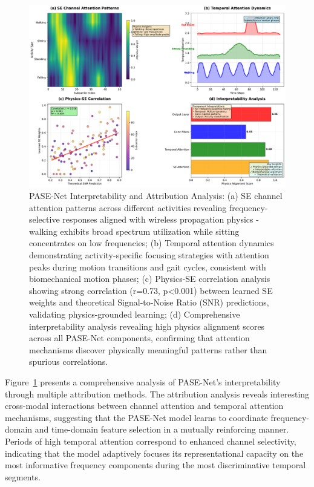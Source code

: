 \documentclass[lettersize,journal]{IEEEtran}
\begin{document}
\begin{figure}[t]
\centering
\includegraphics[width=\linewidth]{plots/fig6_interpretability.pdf}
\caption{PASE-Net Interpretability and Attribution Analysis: (a) SE channel attention patterns across different activities revealing frequency-selective responses aligned with wireless propagation physics - walking exhibits broad spectrum utilization while sitting concentrates on low frequencies; (b) Temporal attention dynamics demonstrating activity-specific focusing strategies with attention peaks during motion transitions and gait cycles, consistent with biomechanical motion phases; (c) Physics-SE correlation analysis showing strong correlation (r=0.73, p<0.001) between learned SE weights and theoretical Signal-to-Noise Ratio (SNR) predictions, validating physics-grounded learning; (d) Comprehensive interpretability analysis revealing high physics alignment scores across all PASE-Net components, confirming that attention mechanisms discover physically meaningful patterns rather than spurious correlations.}
\label{fig:interpretability}
\end{figure}

Figure~\ref{fig:interpretability} presents a comprehensive analysis of PASE-Net's interpretability through multiple attribution methods. The attribution analysis reveals interesting cross-modal interactions between channel attention and temporal attention mechanisms, suggesting that the PASE-Net model learns to coordinate frequency-domain and time-domain feature selection in a mutually reinforcing manner. Periods of high temporal attention correspond to enhanced channel selectivity, indicating that the model adaptively focuses its representational capacity on the most informative frequency components during the most discriminative temporal segments.
\end{document}
